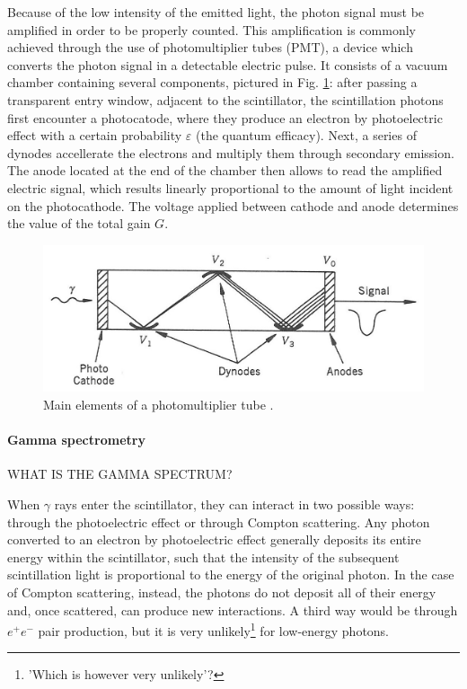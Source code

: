 Because of the low intensity of the emitted light, the photon signal must be amplified in order to be properly counted.
This amplification is commonly achieved through the use of photomultiplier tubes (PMT), a device which converts the photon signal in a detectable electric pulse.
It consists of a vacuum chamber containing several components, pictured in Fig. \ref{fig:photomultiplier}: 
after passing a transparent entry window, adjacent to the scintillator, the scintillation photons first encounter a photocatode, 
where they produce an electron by photoelectric effect with a certain probability $\varepsilon$ (the quantum efficacy).
Next, a series of dynodes accellerate the electrons and multiply them through secondary emission.
The anode located at the end of the chamber then allows to read the amplified electric signal, 
which results linearly proportional to the amount of light incident on the photocathode.
The voltage applied between cathode and anode determines the value of the total gain $G$.
\begin{figure}[htbp]
    \centering
    \includegraphics[scale=1.2]{figures/photomultiplier.jpg}
    \caption{Main elements of a photomultiplier tube \cite{intro_nuclear_particle_physics}.}
    \label{fig:photomultiplier}
\end{figure}

\paragraph{Gamma spectrometry}
WHAT IS THE GAMMA SPECTRUM?

When $\gamma$ rays enter the scintillator, they can interact in two possible ways: through the photoelectric effect or through Compton scattering.
Any photon converted to an electron by photoelectric effect generally deposits its entire energy within the scintillator, such that the intensity of the subsequent scintillation light is proportional to the energy of the original photon.
In the case of Compton scattering, instead, the photons do not deposit all of their energy and, once scattered, can produce new interactions.
A third way would be through $e^+ e^-$ pair production, but it is very unlikely\footnote{'Which is however very unlikely'?} for low-energy photons.


